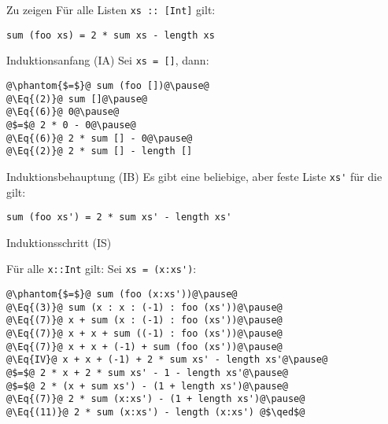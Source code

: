 \documentclass{beamer}
\begin{document}
\begin{frame}[fragile]{Zu zeigen}
  Für alle Listen \lstinline{xs :: [Int]} gilt:

\begin{lstlisting}
sum (foo xs) = 2 * sum xs - length xs
\end{lstlisting}

\end{frame}


\begin{frame}[fragile]{Induktionsanfang (IA)}
  Sei \lstinline{xs = []}, dann:

\begin{lstlisting}
@\phantom{$=$}@ sum (foo [])@\pause@
@\Eq{(2)}@ sum []@\pause@
@\Eq{(6)}@ 0@\pause@
@$=$@ 2 * 0 - 0@\pause@
@\Eq{(6)}@ 2 * sum [] - 0@\pause@
@\Eq{(2)}@ 2 * sum [] - length []
\end{lstlisting}
\end{frame}


\begin{frame}[fragile]{Induktionsbehauptung (IB)}
  Es gibt eine beliebige, aber feste Liste \lstinline{xs'} für die gilt:

\begin{lstlisting}
sum (foo xs') = 2 * sum xs' - length xs'
\end{lstlisting}
\end{frame}


\begin{frame}[fragile]{Induktionsschritt (IS)}

  Für alle \lstinline{x::Int} gilt: Sei \lstinline{xs = (x:xs')}:

\begin{lstlisting}
@\phantom{$=$}@ sum (foo (x:xs'))@\pause@
@\Eq{(3)}@ sum (x : x : (-1) : foo (xs'))@\pause@
@\Eq{(7)}@ x + sum (x : (-1) : foo (xs'))@\pause@
@\Eq{(7)}@ x + x + sum ((-1) : foo (xs'))@\pause@
@\Eq{(7)}@ x + x + (-1) + sum (foo (xs'))@\pause@
@\Eq{IV}@ x + x + (-1) + 2 * sum xs' - length xs'@\pause@
@$=$@ 2 * x + 2 * sum xs' - 1 - length xs'@\pause@
@$=$@ 2 * (x + sum xs') - (1 + length xs')@\pause@
@\Eq{(7)}@ 2 * sum (x:xs') - (1 + length xs')@\pause@
@\Eq{(11)}@ 2 * sum (x:xs') - length (x:xs') @$\qed$@
\end{lstlisting}
\end{frame}
\end{document}
